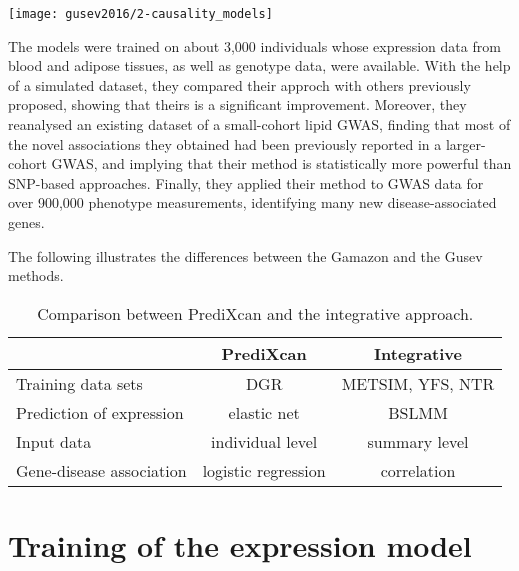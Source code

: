 \documentclass[../main.tex]{subfiles}
\begin{document}
\begin{marginfigure}[-2cm]
	\texttt{[image: gusev2016/2-causality\_models]}
	\caption{}
\end{marginfigure}

The models were trained on about 3,000 individuals whose expression data 
from blood and adipose tissues, as well as genotype data, were 
available. With the help of a simulated dataset, they compared their 
approch with others previously proposed, showing that theirs is a 
significant improvement. Moreover, they reanalysed an existing dataset 
of a small-cohort lipid GWAS, finding that most of the novel 
associations they obtained had been previously reported in a 
larger-cohort GWAS, and implying that their method is statistically more 
powerful than SNP-based approaches. Finally, they applied their method 
to GWAS data for over 900,000 phenotype measurements, identifying many 
new disease-associated genes.

The following  illustrates the differences between 
the Gamazon and the Gusev methods.

\begin{table}
	\begin{tabular}{ l c c }
		\toprule
		& PrediXcan & Integrative \\
		\midrule
		Training data sets & DGR & METSIM, YFS, NTR \\
		Prediction of expression & elastic net & BSLMM \\
		Input data & individual level & summary level \\
		Gene-disease association & logistic regression & correlation \\
		\bottomrule
	\end{tabular}
	\caption{Comparison between PrediXcan and the integrative approach.}
\end{table}

\section{Training of the expression model}
\end{document}
